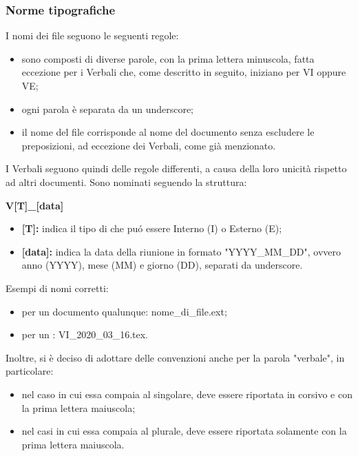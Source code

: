     \subsubsection{Norme tipografiche}
        I nomi dei file seguono le seguenti regole:
        \begin{itemize}
          \item sono composti di diverse parole, con la prima lettera minuscola, fatta eccezione per i Verbali che, come descritto in seguito, iniziano per VI oppure VE;
          \item ogni parola è separata da un underscore;
          \item il nome del file corrisponde al nome del documento senza escludere le preposizioni, ad eccezione dei Verbali, come già menzionato.
        \end{itemize}
        I Verbali seguono quindi delle regole differenti, a causa della loro unicità rispetto ad altri documenti. Sono nominati seguendo la struttura:
        \begin{center}
          \textbf{{V[T]\_[data]}}
        \end{center}
        \begin{itemize}
          \item \textbf{[T]:} indica il tipo di \Verbale{} che puó essere Interno (I) o Esterno (E);
          \item \textbf{[data]:} indica la data della riunione in formato "YYYY\_MM\_DD", ovvero anno (YYYY), mese (MM) e giorno (DD), separati da underscore.
        \end{itemize}
        Esempi di nomi corretti:
        \begin{itemize}
          \item per un documento qualunque: nome\_di\_file.ext;
          \item per un \Verbale{}: VI\_2020\_03\_16.tex.
        \end{itemize}
    	\noindent Inoltre, si è deciso di adottare delle convenzioni anche per la parola "verbale", in particolare: 
    	\begin{itemize}
    		\item nel caso in cui essa compaia al singolare, deve essere riportata in corsivo e con la prima lettera maiuscola; 
    		\item nel casi in cui essa compaia al plurale, deve essere riportata solamente con la prima lettera maiuscola. 
    	\end{itemize}

